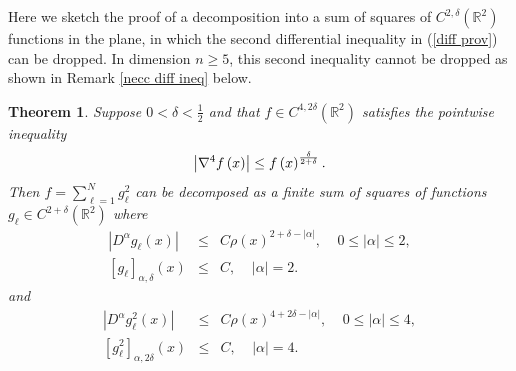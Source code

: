 \documentclass{amsart}
\newtheorem{theorem}{Theorem}[section]
\theoremstyle{plain}
\numberwithin{equation}{section}
\begin{document}
Here we sketch the proof of a decomposition into a sum of squares of $%
C^{2,\delta }\left( \mathbb{R}^{2}\right) $ functions in the plane, in which
the second differential inequality in (\ref{diff prov}) can be dropped. In
dimension $n\geq 5$, this second inequality cannot be dropped as shown in
Remark \ref{necc diff ineq} below.

\begin{theorem}
\label{main 2D}Suppose $0<\delta <\frac{1}{2}$ and that $f\in C^{4,2\delta
}\left( \mathbb{R}^{2}\right) $ satisfies the pointwise inequality%
\begin{equation}
\left\vert \nabla ^{4}f\left( x\right) \right\vert \leq f\left( x\right) ^{%
\frac{\delta }{2+\delta }}.  \label{crucial point}
\end{equation}%
Then $f=\sum_{\ell =1}^{N}g_{\ell }^{2}$ can be decomposed as a finite sum
of squares of functions $g_{\ell }\in C^{2+\delta }\left( \mathbb{R}%
^{2}\right) $ where 
\begin{eqnarray*}
\left\vert D^{\alpha }g_{\ell }\left( x\right) \right\vert &\leq &C\rho
\left( x\right) ^{2+\delta -\left\vert \alpha \right\vert },\ \ \ \ \ 0\leq
\left\vert \alpha \right\vert \leq 2, \\
\left[ g_{\ell }\right] _{\alpha ,\delta }\left( x\right) &\leq &C,\ \ \ \ \
\left\vert \alpha \right\vert =2.
\end{eqnarray*}%
and%
\begin{eqnarray*}
\left\vert D^{\alpha }g_{\ell }^{2}\left( x\right) \right\vert &\leq &C\rho
\left( x\right) ^{4+2\delta -\left\vert \alpha \right\vert },\ \ \ \ \ 0\leq
\left\vert \alpha \right\vert \leq 4, \\
\left[ g_{\ell }^{2}\right] _{\alpha ,2\delta }\left( x\right) &\leq &C,\ \
\ \ \ \left\vert \alpha \right\vert =4.
\end{eqnarray*}
\end{theorem}
\end{document}
